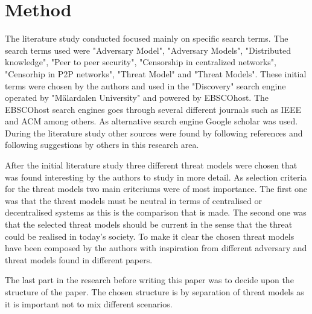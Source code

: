 \section{Method}
The literature study conducted focused mainly on specific search terms. The search terms used were "Adversary Model", "Adversary Models", "Distributed knowledge", "Peer to peer security", "Censorship in centralized networks", "Censorhip in P2P networks", "Threat Model" and "Threat Models".
These initial terms were chosen by the authors and used in the "Discovery" search engine operated by "M\"{a}lardalen University" and powered by EBSCOhost.
The EBSCOhost search engines goes through several different journals such as IEEE and ACM among others.
As alternative search engine Google scholar was used.
During the literature study other sources were found by following references and following suggestions by others in this research area.

After the initial literature study three different threat models were chosen that was found interesting by the authors to study in more detail.
As selection criteria for the threat models two main criteriums were of most importance. 
The first one was that the threat models must be neutral in terms of centralised or decentralised systems as this is the comparison that is made.
The second one was that the selected threat models should be current in the sense that the threat could be realised in today's society.
To make it clear the chosen threat models have been composed by the authors with inspiration from different adversary and threat models found in different papers.

The last part in the research before writing this paper was to decide upon the structure of the paper. The chosen structure is by separation of threat models as it is important not to mix different scenarios.

